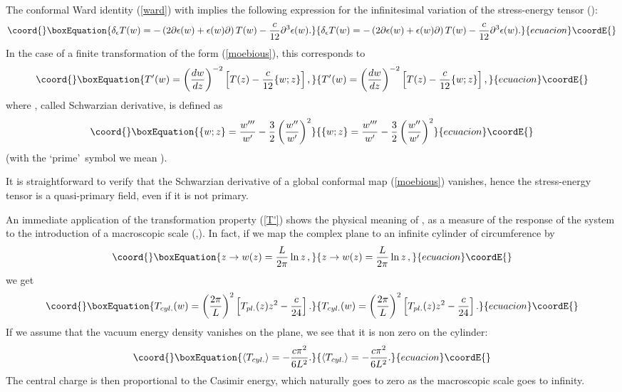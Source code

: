 \documentclass[a4paper,12pt]{report}
\begin{document}
The conformal Ward identity (\ref{ward}) with \coordHE{} implies the following expression for the infinitesimal
variation of the stress-energy tensor (\cite{bpz}):
\begin{equation}\coord{}\boxEquation{\label{dT}
\delta_{\epsilon}
T(w)=-\left(2\partial\epsilon(w)+\epsilon(w)\partial\right)T(w)-\frac{c}{12}\partial^{3}\epsilon(w).
}{\delta_{\epsilon}
T(w)=-\left(2\partial\epsilon(w)+\epsilon(w)\partial\right)T(w)-\frac{c}{12}\partial^{3}\epsilon(w).
}{ecuacion}\coordE{}\end{equation}
In the case of a finite transformation of the form (\ref{moebious}), this corresponds to
\begin{equation}\coord{}\boxEquation{\label{T'}
T'(w)=\left(\frac{dw}{dz}\right)^{-2}\left[T(z)-\frac{c}{12}\{w;z\}\right],
}{T'(w)=\left(\frac{dw}{dz}\right)^{-2}\left[T(z)-\frac{c}{12}\{w;z\}\right],
}{ecuacion}\coordE{}\end{equation}
where \coordHE{}, called Schwarzian derivative, is defined as
\begin{equation}\coord{}\boxEquation{\label{schw}
\{w;z\}=\frac{w'''}{w'}-\frac{3}{2}\left(\frac{w''}{w'}\right)^{2}
}{\{w;z\}=\frac{w'''}{w'}-\frac{3}{2}\left(\frac{w''}{w'}\right)^{2}
}{ecuacion}\coordE{}\end{equation}
(with the \lq prime\rq \, symbol we mean \coordHE{}).

It is straightforward to verify that the Schwarzian derivative of a global conformal map (\ref{moebious})
vanishes, hence the stress-energy tensor is a quasi-primary field, even if it is not primary.

An immediate application of the transformation property (\ref{T'}) shows the physical meaning of \coordHE{}, as a
measure of the response of the system to the introduction of a macroscopic scale
(\cite{casimir1},\cite{casimir2}). In fact, if we map the complex plane to an infinite cylinder of circumference
\coordHE{} by
\begin{equation}\coord{}\boxEquation{\label{cyl}
z\rightarrow w(z)=\frac{L}{2\pi}\ln z\,,
}{z\rightarrow w(z)=\frac{L}{2\pi}\ln z\,,
}{ecuacion}\coordE{}\end{equation}
we get
\begin{equation}\coord{}\boxEquation{
T_{cyl.}(w)=\left(\frac{2\pi}{L}\right)^{2}\left[T_{pl.}(z)z^{2}-\frac{c}{24}\right].
}{
T_{cyl.}(w)=\left(\frac{2\pi}{L}\right)^{2}\left[T_{pl.}(z)z^{2}-\frac{c}{24}\right].
}{ecuacion}\coordE{}\end{equation}
If we assume that the vacuum energy density \coordHE{} vanishes on the plane, we see that it is non
zero on the cylinder:
\begin{equation}\coord{}\boxEquation{\label{cas}
\langle T_{cyl.}\rangle=-\frac{c\pi^{2}}{6L^{2}}.
}{\langle T_{cyl.}\rangle=-\frac{c\pi^{2}}{6L^{2}}.
}{ecuacion}\coordE{}\end{equation}
The central charge is then proportional to the Casimir energy, which naturally goes to zero as the macroscopic
scale \coordHE{} goes to infinity.
\end{document}

